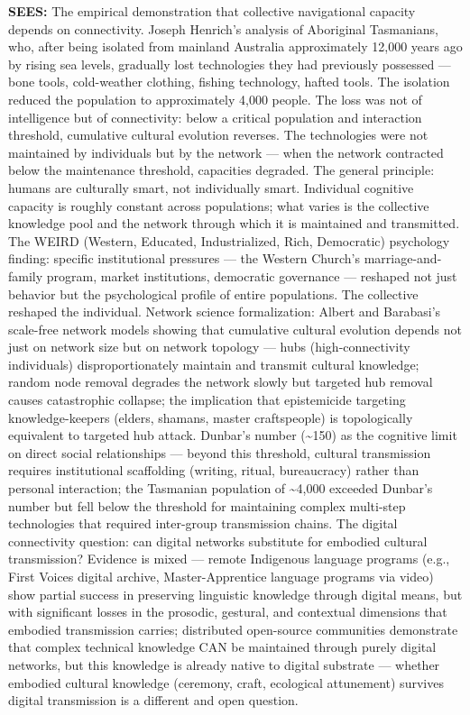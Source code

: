 \textbf{SEES:} The empirical demonstration that collective navigational capacity depends on connectivity. Joseph Henrich's analysis of Aboriginal Tasmanians, who, after being isolated from mainland Australia approximately 12,000 years ago by rising sea levels, gradually lost technologies they had previously possessed — bone tools, cold-weather clothing, fishing technology, hafted tools. The isolation reduced the population to approximately 4,000 people. The loss was not of intelligence but of connectivity: below a critical population and interaction threshold, cumulative cultural evolution reverses. The technologies were not maintained by individuals but by the network — when the network contracted below the maintenance threshold, capacities degraded. The general principle: humans are culturally smart, not individually smart. Individual cognitive capacity is roughly constant across populations; what varies is the collective knowledge pool and the network through which it is maintained and transmitted. The WEIRD (Western, Educated, Industrialized, Rich, Democratic) psychology finding: specific institutional pressures — the Western Church's marriage-and-family program, market institutions, democratic governance — reshaped not just behavior but the psychological profile of entire populations. The collective reshaped the individual. Network science formalization: Albert and Barabasi's scale-free network models showing that cumulative cultural evolution depends not just on network size but on network topology — hubs (high-connectivity individuals) disproportionately maintain and transmit cultural knowledge; random node removal degrades the network slowly but targeted hub removal causes catastrophic collapse; the implication that epistemicide targeting knowledge-keepers (elders, shamans, master craftspeople) is topologically equivalent to targeted hub attack. Dunbar's number (\textasciitilde{}150) as the cognitive limit on direct social relationships — beyond this threshold, cultural transmission requires institutional scaffolding (writing, ritual, bureaucracy) rather than personal interaction; the Tasmanian population of \textasciitilde{}4,000 exceeded Dunbar's number but fell below the threshold for maintaining complex multi-step technologies that required inter-group transmission chains. The digital connectivity question: can digital networks substitute for embodied cultural transmission? Evidence is mixed — remote Indigenous language programs (e.g., First Voices digital archive, Master-Apprentice language programs via video) show partial success in preserving linguistic knowledge through digital means, but with significant losses in the prosodic, gestural, and contextual dimensions that embodied transmission carries; distributed open-source communities demonstrate that complex technical knowledge CAN be maintained through purely digital networks, but this knowledge is already native to digital substrate — whether embodied cultural knowledge (ceremony, craft, ecological attunement) survives digital transmission is a different and open question.


